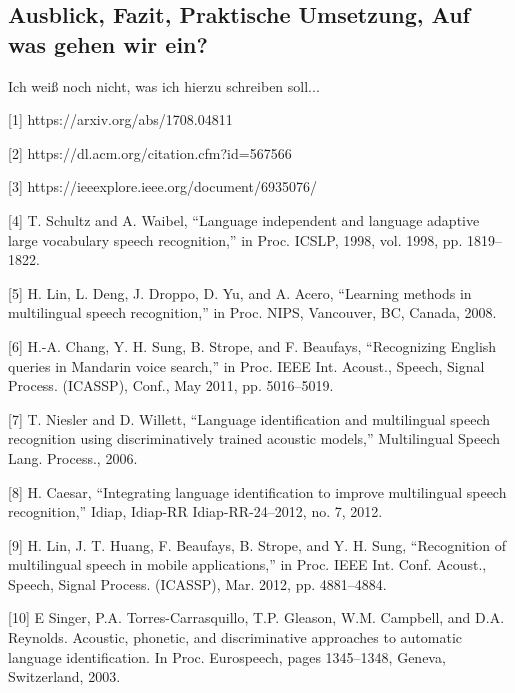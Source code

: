 \subsection{Ausblick, Fazit, Praktische Umsetzung, Auf was gehen wir ein?}
Ich weiß noch nicht, was ich hierzu schreiben soll...

[1] https://arxiv.org/abs/1708.04811

[2] https://dl.acm.org/citation.cfm?id=567566

[3] https://ieeexplore.ieee.org/document/6935076/

[4] T. Schultz and A. Waibel, “Language independent and language adaptive
large vocabulary speech recognition,” in Proc. ICSLP, 1998, vol.
1998, pp. 1819–1822.

[5] H. Lin, L. Deng, J. Droppo, D. Yu, and A. Acero, “Learning methods
in multilingual speech recognition,” in Proc. NIPS, Vancouver, BC,
Canada, 2008.

[6] H.-A. Chang, Y. H. Sung, B. Strope, and F. Beaufays, “Recognizing
English queries in Mandarin voice search,” in Proc. IEEE
Int. Acoust., Speech, Signal Process. (ICASSP), Conf., May 2011,
pp. 5016–5019.

[7] T. Niesler and D. Willett, “Language identification and multilingual
speech recognition using discriminatively trained acoustic models,”
Multilingual Speech Lang. Process., 2006.

[8] H. Caesar, “Integrating language identification to improve multilingual
speech recognition,” Idiap, Idiap-RR Idiap-RR-24–2012, no. 7,
2012.

[9] H. Lin, J. T. Huang, F. Beaufays, B. Strope, and Y. H. Sung, “Recognition
of multilingual speech in mobile applications,” in Proc. IEEE
Int. Conf. Acoust., Speech, Signal Process. (ICASSP), Mar. 2012, pp.
4881–4884.

[10] E Singer, P.A. Torres-Carrasquillo, T.P. Gleason, W.M.
Campbell, and D.A. Reynolds. Acoustic, phonetic, and
discriminative approaches to automatic language identification.
In Proc. Eurospeech, pages 1345–1348, Geneva,
Switzerland, 2003.